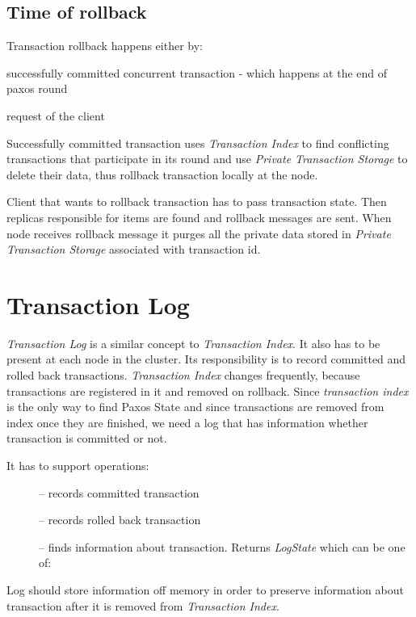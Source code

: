 \subsection{Time of rollback}
Transaction rollback happens either by:
\begin{enumerate*}
\item successfully committed concurrent transaction - which happens at the end of paxos round
\item request of the client
\end{enumerate*}

Successfully committed transaction uses \emph{Transaction Index} to find conflicting transactions that participate in its round and use \emph{Private Transaction Storage} to delete their data, thus rollback transaction locally at the node.

Client that wants to rollback transaction has to pass transaction state. Then replicas responsible for items are found and rollback messages are sent. When node receives rollback message it purges all the private data stored in \emph{Private Transaction Storage} associated with transaction id.

\section{Transaction Log}
\emph{Transaction Log} is a similar concept to \emph{Transaction Index}. It also has to be present at each node in the cluster. Its responsibility is to record committed and rolled back transactions. \emph{Transaction Index} changes frequently, because transactions are registered in it and removed on rollback. Since \emph{transaction index} is the only way to find Paxos State and since transactions are removed from index once they are finished, we need a log that has information whether transaction is committed or not.


It has to support operations:
\begin{description}
\item[] -- records committed transaction
\item[] -- records rolled back transaction
\item[] -- finds information about transaction. Returns \emph{LogState} which can be one of:  
\end{description}
Log should store information off memory in order to preserve information about transaction after it is removed from \emph{Transaction Index}.

